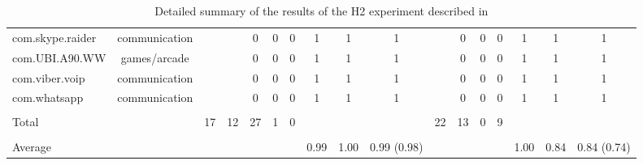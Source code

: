 \begin{table*}
\begin{small}
\begin{center}
{\begin{tabular}{|l|c|c||c|c|c|c|c|c|c||c|c|c|c|c|c|c|}
com.skype.raider       &       communication       &            &            &      0      &      0      &      0      &      1      &      1      &      1      &            &      0      &      0      &      0      &      1      &      1      &      1      \\
com.UBI.A90.WW       &       games/arcade       &            &            &      0      &      0      &      0      &      1      &      1      &      1      &            &      0      &      0      &      0      &      1      &      1      &      1      \\
com.viber.voip       &       communication       &            &            &      0      &      0      &      0      &      1      &      1      &      1      &            &      0      &      0      &      0      &      1      &      1      &      1      \\
com.whatsapp         &       communication       &            &            &      0      &      0      &      0      &      1      &      1      &      1      &            &      0      &      0      &      0      &      1      &      1      &      1      \\
\hline
\hline
 & & & & & & & & & & & & & & & &\\[-0.10in]
Total                &             &      17      &      12      &      27      &      1      &      0      &                 &                 &                 &      22      &      13      &      0      &      9      &                 &                 &                 \\
\hline
 & & & & & & & & & & & & & & & &\\[-0.10in]
Average              &             &              &              &              &         	  &             &      0.99      &      1.00      &      0.99 (0.98)      &              &              &             &             &      1.00     &      0.84      &      0.84 (0.74)      \\
\hline
\end{tabular}
}%
\end{center}
\caption{\label{Ta:realworldAll}Detailed summary of the results of the H2 experiment described in }
\end{small}
\end{table*} 


